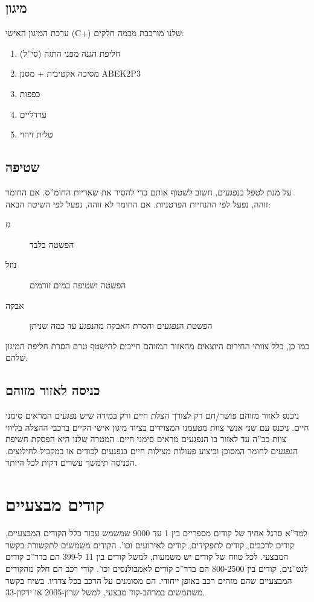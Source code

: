 \documentclass{article}
\begin{document}
\subsection{מיגון}
ערכת המיגון האישי (C+) שלנו מורכבת מכמה חלקים:
\begin{enumerate}
    \item חליפת הגנה מפני התזה (סי''ל)
    \item מסיכה אקטיבית + מסנן ABEK2P3
    \item כפפות
    \item ערדליים
    \item טלית זיהוי
\end{enumerate}
\subsection{שטיפה}
על מנת לטפל בנפגעים, חשוב לשטוף אותם כדי להסיר את שאריות החומ''ס. אם החומר זוהה, נפעל לפי ההנחיות הפרטניות. אם החומר לא זוהה, נפעל לפי השיטה הבאה:
\begin{description}
    \item[גז] הפשטה בלבד
    \item[נוזל] הפשטה ושטיפה במים זורמים
    \item[אבקה] הפשטת הנפגעים והסרת האבקה מהנפגע עד כמה שניתן
\end{description}
כמו כן, כלל צוותי החירום היוצאים מהאזור המזוהם חייבים להישטף טרם הסרת חליפת המיגון שלהם.
\subsection{כניסה לאזור מזוהם}
ניכנס לאזור מזוהם פושר/חם רק לצורך הצלת חיים ורק במידה שיש נפגעים המראים סימני חיים. ניכנס עם שני אנשי צוות מטעמנו המצוידים בציוד מיגון אישי הקיים ברכבי ההצלה בליווי צוות כב''ה עד לאזור בו הנפגעים מראים סימני חיים. המטרה שלנו היא הפסקת חשיפת הנפגעים לחומר המסוכן וביצוע פעולות מצילות חיים בנפגעים לכודים או במקביל לחילוצים. הכניסה תימשך עשרים דקות לכל היותר.
\section{קודים מבצעיים}
למד''א סרגל אחיד של קודים מספריים בין 1 עד 9000 שמשמש עבור כלל הקודים המבצעיים, קודים לרכבים, קודים לתפקידים, קודים לאירועים וכו'. הקודים משמשים לתקשורת בקשר המבצעי. לכל טווח של קודים יש משמעות, למשל קודים בין 11 ל-399 הם בדר''כ קודים לנט''נים, קודים בין 800-2500 הם בדר''כ קודים לאמבולנסים וכו'. קודי רכב הם חלק מהקודים המבצעיים שהם מזהים רכב באופן ייחודי. הם מסומנים על הרכב בכל צדדיו. בשיח בקשר משתמשים במרחב-קוד מבצעי, למשל שרון-2005 או ירקון-33.
\end{document}
